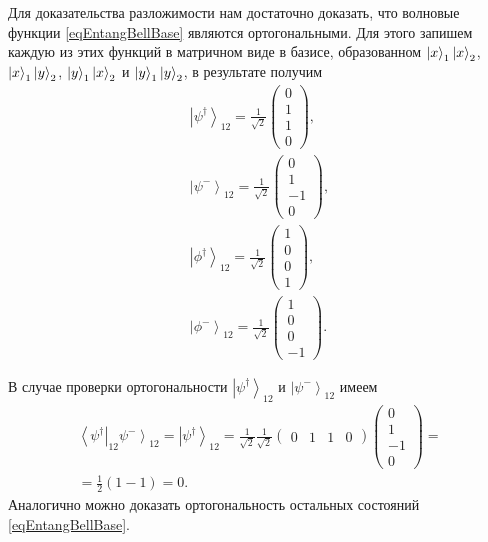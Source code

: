 Для доказательства разложимости нам достаточно доказать, что волновые
функции \eqref{eqEntangBellBase} являются ортогональными. Для этого
запишем каждую из этих функций в матричном виде в базисе, образованном
$\ket{x}_1\ket{x}_2$, $\ket{x}_1\ket{y}_2$,
$\ket{y}_1\ket{x}_2$ и
$\ket{y}_1\ket{y}_2$, в результате получим 
\begin{eqnarray}
  \left|\psi^{\dag}\right>_{12} = 
  \frac{1}{\sqrt{2}}
  \left(
  \begin{array}{c}
    0 \\
    1 \\
    1 \\
    0
  \end{array}
  \right),
  \nonumber \\
  \left|\psi^{-}\right>_{12} = 
  \frac{1}{\sqrt{2}}
  \left(
  \begin{array}{c}
    0 \\
    1 \\
    -1 \\
    0
  \end{array}
  \right),
  \nonumber \\
  \left|\phi^{\dag}\right>_{12} = 
  \frac{1}{\sqrt{2}}
  \left(
  \begin{array}{c}
    1 \\
    0 \\
    0 \\
    1
  \end{array}
  \right),
  \nonumber \\
  \left|\phi^{-}\right>_{12} = 
  \frac{1}{\sqrt{2}}
  \left(
  \begin{array}{c}
    1 \\
    0 \\
    0 \\
    -1
  \end{array}
  \right).
  \label{eqEntangBellBaseMatrix}
\end{eqnarray}

В случае проверки ортогональности $\left|\psi^{\dag}\right>_{12}$ и 
$\left|\psi^{-}\right>_{12}$ имеем
\begin{eqnarray}
\left<\psi^{\dag}\right|_{12}\left.\psi^{-}\right>_{12} = 
  \left|\psi^{\dag}\right>_{12} = 
  \frac{1}{\sqrt{2}} \frac{1}{\sqrt{2}}
  \left(
  \begin{array}{cccc}
    0 & 1 & 1 & 0
  \end{array}
  \right)   
  \left(
  \begin{array}{c}
    0 \\
    1 \\
    -1 \\
    0
  \end{array}
  \right) = 
\nonumber \\
=
  \frac{1}{2}\left(1 - 1\right) = 0.
\nonumber 
\end{eqnarray}
Аналогично можно доказать ортогональность остальных состояний
\eqref{eqEntangBellBase}. 

